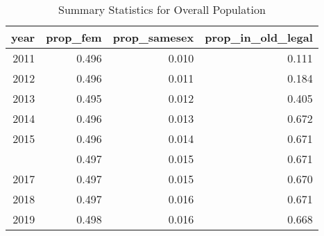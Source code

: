 \begin{table}

\caption{Summary Statistics for Overall Population}
\centering
\begin{tabular}[t]{rrrr}
\toprule
year & prop\_fem & prop\_samesex & prop\_in\_old\_legal\\
\midrule
2011 & 0.496 & 0.010 & 0.111\\
2012 & 0.496 & 0.011 & 0.184\\
2013 & 0.495 & 0.012 & 0.405\\
2014 & 0.496 & 0.013 & 0.672\\
2015 & 0.496 & 0.014 & 0.671\\
\addlinespace
2016 & 0.497 & 0.015 & 0.671\\
2017 & 0.497 & 0.015 & 0.670\\
2018 & 0.497 & 0.016 & 0.671\\
2019 & 0.498 & 0.016 & 0.668\\
\bottomrule
\end{tabular}
\end{table}
